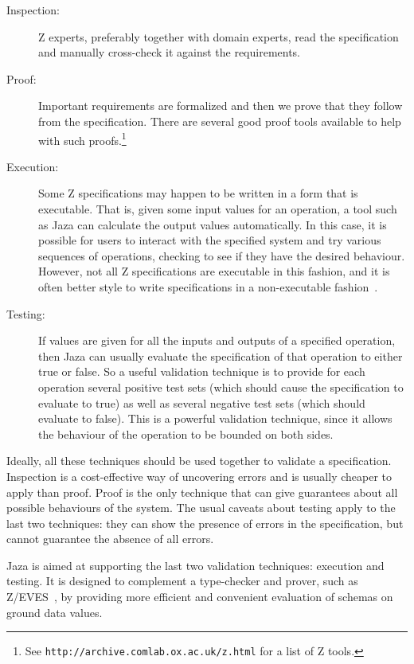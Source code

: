 \documentclass[11pt]{article}
\newcommand{\Jaza}{Jaza}
\newcommand{\url}[1]{\texttt{#1}}
\begin{document}
\begin{description}
\item[Inspection:] Z experts, preferably together with domain experts, 
  read the specification and manually cross-check it against the
  requirements.
\item[Proof:] Important requirements are formalized and then we prove that
  they follow from the specification.  There are several good proof tools
  available to help with such proofs.\footnote{See
    \url{http://archive.comlab.ox.ac.uk/z.html} for a list of Z tools.}
\item[Execution:] Some Z specifications may happen to be written in
  a form that is executable.  That is, given some input values for
  an operation, a tool such as {\Jaza} can calculate the output values
  automatically.  In this case, it is possible for users to interact
  with the specified system and try various sequences of operations,
  checking to see if they have the desired behaviour.
  However, not all Z specifications are executable in this fashion,
  and it is often better style to write specifications in a
  non-executable fashion~\cite{hayes:specs-not-exec}.
\item[Testing:] If values are given for all the inputs and outputs
  of a specified operation, then {\Jaza} can usually evaluate the
  specification of that operation to either true or false.
  So a useful validation technique is to provide for each operation
  several positive test sets (which should cause the specification to
  evaluate to true)
  as well as several negative test sets (which should evaluate to false).
  This is a powerful validation technique, since it allows the behaviour of
  the operation to be bounded on both sides.
\end{description}

Ideally, all these techniques should be used together to validate a
specification.  Inspection is a cost-effective way of uncovering errors and
is usually cheaper to apply than proof.  Proof is the only technique that
can give guarantees about all possible behaviours of the system.  The usual
caveats about testing apply to the last two techniques: they can show the
presence of errors in the specification, but cannot guarantee the absence
of all errors.

{\Jaza} is aimed at supporting the last two validation techniques:
execution and testing.  It is designed to complement a type-checker
and prover, such as Z/EVES~\cite{saaltink:zeves-system}, by providing
more efficient and convenient evaluation of schemas on ground data values.
\end{document}

